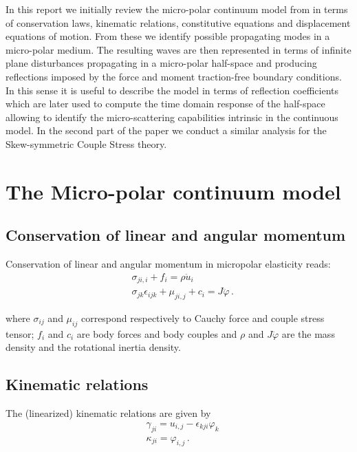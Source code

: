 \documentclass[12pt]{article}
\begin{document}
In this report we initially review the micro-polar continuum model from \cite{Eringen1966} in terms of conservation laws, kinematic relations, constitutive equations and displacement equations of motion. From these we identify possible propagating modes in a micro-polar medium. The resulting waves are then represented in terms of infinite plane disturbances propagating in a micro-polar half-space and producing reflections imposed by the force and moment traction-free boundary conditions. In this sense it is useful to describe the model in terms of reflection coefficients which are later used to compute the time domain response of the half-space allowing to identify the micro-scattering capabilities intrinsic in the continuous model. In the second part of the paper we conduct a similar analysis for the Skew-symmetric Couple Stress theory.




\section{The Micro-polar continuum model}
\subsection{Conservation of linear and angular momentum}
Conservation of linear and angular momentum in micropolar elasticity reads:
\begin{subequations}\label{eq:conservation}
  \begin{align}
    &\sigma_{ji, i} + f_i = \rho \ddot{u}_i\\
    &\sigma_{jk} \epsilon_{ijk} + \mu_{ji, j} + c_i = J \ddot{\varphi}\, .
  \end{align}
\end{subequations}

where $\sigma_{ij}$ and $\mu_{ij}$ correspond respectively to Cauchy force and couple stress tensor; $ f_i $ and $c_i$ are body forces and body couples and $\rho$ and $ J \ddot{\varphi}$ are the mass density and the rotational inertia density.

\subsection{Kinematic relations}
The (linearized) kinematic relations are given by
\begin{subequations}\label{eq:kinematics}
  \begin{align}
    & \gamma_{ji} = u_{i,j} - \epsilon_{kji} \varphi_k\\
    & \kappa_{ji} = \varphi_{i,j}\, .
  \end{align}
\end{subequations}
\end{document}
